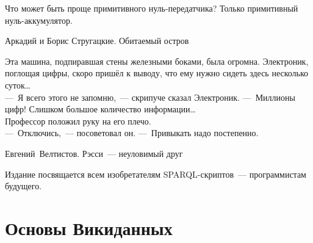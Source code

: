 \documentclass[nofonts,justified,nobib,openany]{tufte-book}%
\theoremstyle{definition}
\begin{document}
\clearpage
\vfill
\begin{fullwidth}

\makeatletter\setlength\hsize{\@tufte@fullwidth}\makeatother

\renewcommand{\epigraphsize}{\Large}
\renewcommand{\epigraphflush}{flushright}
\setlength{\epigraphwidth}{.7\linewidth}

\epigraph{Что может быть проще примитивного нуль-передатчика? Только примитивный нуль-аккумулятор.}{%
Аркадий и Борис Стругацкие. Обитаемый остров}

\vspace{36px}

\epigraph{%
Эта машина, подпиравшая стены железными боками, была огромна. Электроник, поглощая цифры, скоро пришёл к выводу, что ему нужно сидеть здесь несколько суток\dots\\
---~Я всего этого не запомню,~--- скрипуче сказал Электроник. ---~Миллионы цифр! Слишком большое количество информации\dots\\
Профессор положил руку на его плечо.\\
---~Отключись,~--- посоветовал он. ---~Привыкать надо постепенно.%
}{\mbox{Евгений Велтистов}. Рэсси~--- неуловимый друг}
\vspace{36px}


\setlength{\epigraphrule}{0pt} %
\epigraph{%
Издание посвящается всем изобретателям SPARQL-скриптов~--- программистам будущего.
}{}
\end{fullwidth}





\mainmatter



\renewcommand\lstlistingname{Запрос}%


\part{Основы Викиданных}
\label{part:foundation}




\end{document}
